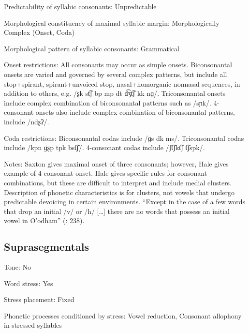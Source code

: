{\begin{appendixdesc}
\item[Predictability of syllabic consonants:] Unpredictable

\item[Morphological constituency of maximal syllable margin:] Morphologically Complex (Onset, Coda)

\item[Morphological pattern of syllabic consonants:] Grammatical

\item[Onset restrictions:] All consonants may occur as simple onsets. Biconsonantal onsets are varied and governed by several complex patterns, but include all stop+spirant, spirant+unvoiced stop, nasal+homorganic nonnasal sequences, in addition to others, e.g. /ʂk st͡ʃ bp mp dt d͡ʒt͡ʃ kk nɡ/. Triconsonantal onsets include complex combination of biconsonantal patterns such as /sɲk/. 4-consonant onsets also include complex combination of biconsonantal patterns, include /ndʂʔ/.

\item[Coda restrictions:] Biconsonantal codas include /ɡs dk ms/. Triconsonantal codas include /kpn ɡʂp tpk bst͡ʃ/. 4-consonant codas include /ʃt͡ʃkt͡ʃ t͡ʃspk/.

\item[Notes:] Saxton gives maximal onset of three consonants; however, Hale gives example of 4-consonant onset. Hale gives specific rules for consonant combinations, but these are difficult to interpret and include medial clusters. Description of phonetic characteristics is for clusters, not vowels that undergo predictable devoicing in certain environments. “Except in the case of a few words that drop an initial /v/ or /h/ […] there are no words that possess an initial vowel in O’odham” (\citealt{DoloresMathiot1991}: 238).
\end{appendixdesc}
\subsection*{Suprasegmentals}
\begin{appendixdesc}
\item[Tone:] No

\item[Word stress:] Yes

\item[Stress placement:] Fixed

\item[Phonetic processes conditioned by stress:] Vowel reduction, Consonant allophony in stressed syllables


\end{appendixdesc}}
